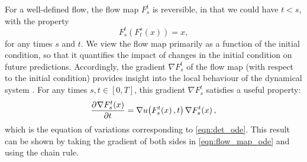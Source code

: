For a well-defined flow, the flow map \(F_s^t\) is reversible, in that we could have \(t < s\), with the property
\[
	F_s^t\!\left(F_t^s\!\left(x\right)\right) = x,
\]
for any times \(s\) and \(t\).
We view the flow map primarily as a function of the initial condition, so that it quantifies the impact of changes in the initial condition on future predictions.
Accordingly, the gradient \(\nabla F_s^t\) of the flow map (with respect to the initial condition) provides insight into the local behaviour of the dynamical system \citep{Arnold_1973_OrdinaryDifferentialEquations,TruesdellNoll_2004_NonLinearFieldTheories}.
For any times \(s, t \in [0,T]\), this gradient	\(\nabla F_s^t\) satisfies a useful property:
\begin{equation}
	\dpd{\nabla F_{s}^{t}\!\left(x\right)}{t} = \nabla u\!\left(F_{s}^{t}\!\left(x\right), t\right) \nabla F_{s}^{t}\!\left(x\right),
	\label{eqn:eqn_of_variations}
\end{equation}
which is the equation of variations corresponding to \cref{eqn:det_ode}.
This result can be shown by taking the gradient of both sides in \cref{eqn:flow_map_ode} and using the chain rule.




